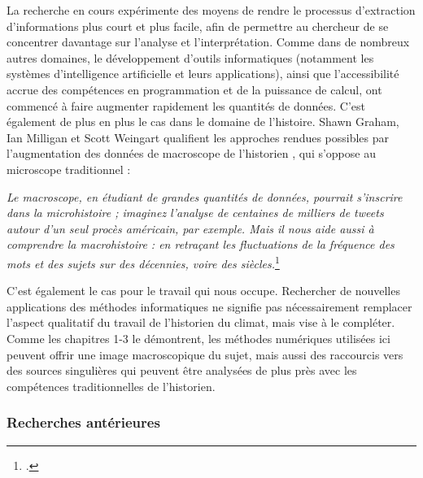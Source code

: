 \documentclass[a4paper,twoside,12pt]{article}
\begin{document}
La recherche en cours expérimente des moyens de rendre le processus d'extraction d'informations plus court et plus facile, afin de permettre au chercheur de se concentrer davantage sur l'analyse et l'interprétation. Comme dans de nombreux autres domaines, le développement d'outils informatiques (notamment les systèmes d'intelligence artificielle et leurs applications), ainsi que l'accessibilité accrue des compétences en programmation et de la puissance de calcul, ont commencé à faire augmenter rapidement les quantités de données. C'est également de plus en plus le cas dans le domaine de l'histoire. Shawn Graham, Ian Milligan et Scott Weingart qualifient les approches rendues possibles par l'augmentation des données de \og macroscope de l'historien \fg{}, qui s'oppose au \og microscope \fg{} traditionnel : \clearpage

\begin{displayquote}
\textit{Le macroscope, en étudiant de grandes quantités de données, pourrait s'inscrire dans la microhistoire ; imaginez l'analyse de centaines de milliers de tweets autour d'un seul procès américain, par exemple. Mais il nous aide aussi à comprendre la macrohistoire : en retraçant les fluctuations de la fréquence des mots et des sujets sur des décennies, voire des siècles.}\footcite[2]{graham_exploring_2016}
\end{displayquote} 

C'est également le cas pour le travail qui nous occupe. Rechercher de nouvelles applications des méthodes informatiques ne signifie pas nécessairement remplacer l'aspect qualitatif du travail de l'historien du climat, mais vise à le compléter. Comme les chapitres 1-3 le démontrent, les méthodes numériques utilisées ici peuvent offrir une image macroscopique du sujet, mais aussi des raccourcis vers des sources singulières qui peuvent être analysées de plus près avec les compétences traditionnelles de l'historien.



\subsubsection*{Recherches antérieures}
\end{document}
